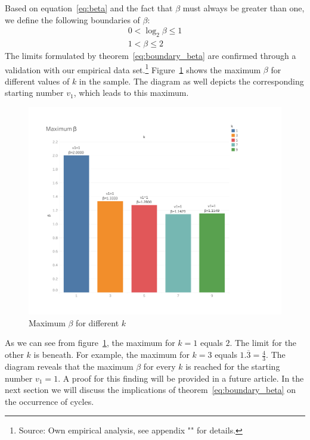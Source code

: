 \documentclass{SciPress_2015}
\begin{document}
Based on equation~\ref{eq:beta} and the fact that $\beta$ must always be greater than one, we define the following boundaries of $\beta$:
\begin{equation}
\label{eq:boundary_beta}
\begin{array}{c}
0<\log_2\beta\le1\\
1<\beta\le2
\end{array}
\end{equation}
The limits formulated by theorem~\ref{eq:boundary_beta} are confirmed through a validation with our empirical data set.\footnote{Source: Own empirical analysis, see appendix "" for details.} Figure~\ref{fig:1} shows the maximum $\beta$ for different values of $k$ in the sample. The diagram as well depicts the corresponding starting number $v_1$, which leads to this maximum.
\begin{figure}[H]
\begin{center}
\includegraphics[trim=40 45 60 40, clip, width=1.0\textwidth]{figures/beta_dashboard.pdf}
\caption{Maximum $\beta$ for different $k$}
\label{fig:1}
\end{center}
\end{figure}

As we can see from figure~\ref{fig:1}, the maximum for $k=1$ equals $2$. The limit for the other $k$ is beneath. For example, the maximum for $k=3$ equals $1.\overline{3}=\frac{4}{3}$. The diagram reveals that the maximum $\beta$ for every $k$ is reached for the starting number $v_1=1$. A proof for this finding will be provided in a future article. In the next section we will discuss the implications of theorem~\ref{eq:boundary_beta} on the occurrence of cycles.
\end{document}
